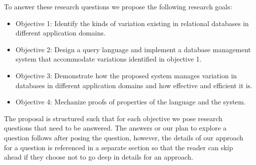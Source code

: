 To answer these research questions we propose the following research goals:

\begin{itemize}
\item Objective 1: Identify the kinds of variation existing in relational databases in 
different application domains.
\item Objective 2: Design a query language and implement a database management 
system that accommodate  variations identified in objective 1.
\item Objective 3: Demonstrate how the proposed system manages
variation in databases in different application domains and how effective and efficient it is.
\item Objective 4: Mechanize proofs of properties of the language and the system.
\end{itemize}

The proposal is structured such that 
for each objective we pose research questions that need to be answered.
The answers or our plan to explore a question follows after posing the question,
however, the details of our approach for a question is referenced in a separate
section so that the reader can skip ahead if they choose not to go deep in details
for an approach.

